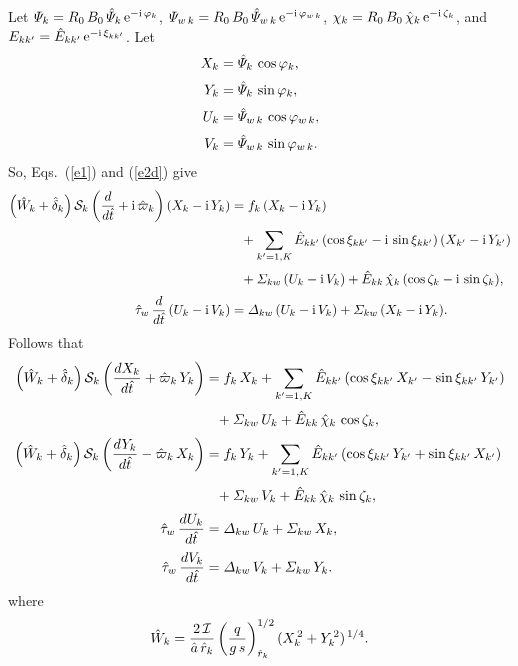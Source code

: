 \documentclass[notitlepage,12pt]{article}
\begin{document}
Let ${\mit\Psi}_k= R_0\,B_0\,\hat{\mit\Psi}_k\,{\rm e}^{-{\rm i}\,\varphi_k}$, ${\mit\Psi}_{w\,k}= R_0\,B_0\,\hat{\mit\Psi}_{w\,k}\,{\rm e}^{-{\rm i}\,\varphi_{w\,k}}$, ${\mit\chi}_k= R_0\,B_0\,\hat{\chi}_k\,{\rm e}^{-{\rm i}\,\zeta_k}$, and $E_{kk'}=\hat{E}_{kk'}\,{\rm e}^{-{\rm i}\,\xi_{kk'}}$.
Let
\begin{align}
X_k &= \hat{\mit\Psi}_k\,\cos\varphi_k,\\[0.5ex]
Y_k &= \hat{\mit\Psi}_k\,\sin\varphi_k,\\[0.5ex]
U_{k} &= \hat{\mit\Psi}_{w\,k}\,\cos\varphi_{w\,k},\\[0.5ex]
V_{k} &= \hat{\mit\Psi}_{w\,k}\,\sin\varphi_{w\,k}.
\end{align}
So, Eqs.~(\ref{e1})  and (\ref{e2d}) give
\begin{align}
\left(\hat{W}_k +\hat{\delta}_k\right){\cal S}_k\left(\frac{d}{d\hat{t}} + {\rm i}\,\hat{\varpi}_k\right)(X_k - {\rm i}\,Y_k)&=
f_k\,(X_k - {\rm i}\,Y_k)\\[0.5ex]
&\phantom{=}+
\sum_{k'=1,K}\hat{E}_{kk'}\,(\cos\xi_{kk'} - {\rm i}\,\sin\xi_{kk'})\,(X_{k'} - {\rm i}\,Y_{k'})\nonumber\\[0.5ex]
&\phantom{=}+ {\mit\Sigma}_{kw}\,(U_{k} - {\rm i}\,V_{k})+ \hat{E}_{kk}\,\hat{\chi}_k\,(\cos\zeta_k - {\rm i }\,\sin\zeta_k),\nonumber\\[0.5ex]
\hat{\tau}_w\,\frac{d}{d\hat{t}}\,(U_{k} - {\rm i}\,V_{k})&={\mit\Delta}_{kw}\,(U_{k} 
- {\rm i}\,V_{k})+{\mit\Sigma}_{kw}\,(X_{k} - {\rm i}\,Y_{k}).\nonumber
\end{align}
Follows that
\begin{align}
\left(\hat{W}_k +\hat{\delta}_k\right){\cal S}_k\left(\frac{dX_k}{d\hat{t}} 
+\hat{\varpi}_k\,Y_k\right)&= f_k\,X_k+\sum_{k'=1,K}\hat{E}_{kk'}\,(\cos\xi_{kk'}\,X_{k'}  -\sin\xi_{kk'}\,Y_{k'}) \\[0.5ex]
&\phantom{=}+{\mit\Sigma}_{kw}\,U_k+ \hat{E}_{kk}\,\hat{\chi}_k\,\cos\zeta_k,\nonumber\\[0.5ex]
\left(\hat{W}_k +\hat{\delta}_k\right){\cal S}_k\left(\frac{dY_k}{d\hat{t}} -\hat{\varpi}_k\,X_k\right)&= f_k\,Y_k+ \sum_{k'=1,K}\hat{E}_{kk'}\,(\cos\xi_{kk'}\,Y_{k'}
+\sin\xi_{kk'}\,X_{k'})\\[0.5ex]
&\phantom{=} +{\mit\Sigma}_{kw}\,V_k+ \hat{E}_{kk}\,\hat{\chi}_k\,\sin\zeta_k,\nonumber\\[0.5ex]
\hat{\tau}_w\,\frac{d U_k}{d\hat{t}}&= {\mit\Delta}_{kw}\,U_k+ {\mit\Sigma}_{kw}\,X_k,\\[0.5ex]
\hat{\tau}_w\,\frac{dV_k}{d\hat{t}}&= {\mit\Delta}_{kw}\,V_k+ {\mit\Sigma}_{kw}\,Y_k.
\end{align}
where
\begin{equation}\label{e23}
\hat{W}_k =\frac{2\,{\cal I}}{\hat{a}\,\hat{r}_k}\left(\frac{q}{g\,s}\right)^{1/2}_{\hat{r}_k} (X_k^{\,2} + Y_k^{\,2})^{\,1/4}.
\end{equation}
\end{document}

